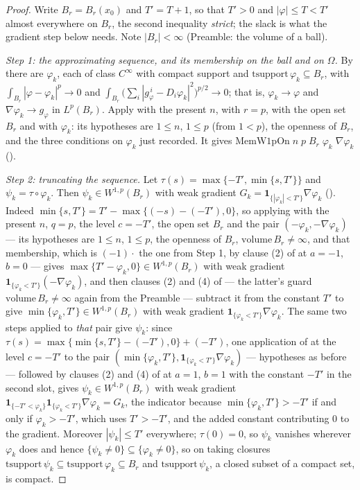 \begin{proof}
Write $B_r=B_r(x_0)$ and $T'=T+1$, so that $T'>0$ and $|\varphi|\le T<T'$
almost everywhere on $B_r$, the second inequality \emph{strict}; the slack is
what the gradient step below needs.  Note $|B_r|<\infty$ (Preamble: the volume
of a ball).

\emph{Step 1: the approximating sequence, and its membership on the ball and on
$\Omega$.}  By  there are $\varphi_k$, each of class
$C^\infty$ with compact support and $\mathrm{tsupport}\,\varphi_k\subseteq B_r$,
with $\int_{B_r}|\varphi-\varphi_k|^p\to0$ and
$\int_{B_r}\bigl(\sum_i|g_\varphi^{\,i}-D_i\varphi_k|^2\bigr)^{p/2}\to0$; that
is, $\varphi_k\to\varphi$ and $\nabla\varphi_k\to g_\varphi$ in $L^p(B_r)$.
Apply  with the present $n$, with $r=p$,
with the open set $B_r$ and with $\varphi_k$: its hypotheses are $1\le n$,
$1\le p$ (from $1<p$), the openness of $B_r$, and the three conditions on
$\varphi_k$ just recorded.  It gives
$\mathrm{MemW1pOn}\;n\;p\;B_r\;\varphi_k\;\nabla\varphi_k$
().

\emph{Step 2: truncating the sequence.}  Let
$\tau(s)=\max\{-T',\min\{s,T'\}\}$ and $\psi_k=\tau\circ\varphi_k$.  Then
$\psi_k\in W^{1,p}(B_r)$ with weak gradient
$G_k=\mathbf1_{\{|\varphi_k|<T'\}}\nabla\varphi_k$ ().
Indeed $\min\{s,T'\}=T'-\max\{(-s)-(-T'),0\}$, so applying
 with the present $n$, $q=p$, the level
$c=-T'$, the open set $B_r$ and the pair $(-\varphi_k,-\nabla\varphi_k)$ ---
its hypotheses are $1\le n$, $1\le p$, the openness of $B_r$,
$\mathrm{volume}\,B_r\ne\infty$, and that membership, which is $(-1)\cdot$ the
one from Step 1, by clause (2) of  at $a=-1$, $b=0$
--- gives $\max\{T'-\varphi_k,0\}\in W^{1,p}(B_r)$ with weak gradient
$\mathbf1_{\{\varphi_k<T'\}}(-\nabla\varphi_k)$, and then clauses (2) and (4) of
 --- the latter's guard
$\mathrm{volume}\,B_r\ne\infty$ again from the Preamble --- subtract it from the
constant $T'$ to give $\min\{\varphi_k,T'\}\in W^{1,p}(B_r)$ with weak gradient
$\mathbf1_{\{\varphi_k<T'\}}\nabla\varphi_k$.  The same two steps applied to
\emph{that} pair give $\psi_k$: since
$\tau(s)=\max\{\min\{s,T'\}-(-T'),0\}+(-T')$, one application of
 at the level $c=-T'$ to the pair
$(\min\{\varphi_k,T'\},\mathbf1_{\{\varphi_k<T'\}}\nabla\varphi_k)$ ---
hypotheses as before --- followed by clauses (2) and (4) of
 at $a=1$, $b=1$ with the constant $-T'$ in the
second slot, gives $\psi_k\in W^{1,p}(B_r)$ with weak gradient
$\mathbf1_{\{-T'<\varphi_k\}}\mathbf1_{\{\varphi_k<T'\}}\nabla\varphi_k=G_k$,
the indicator because $\min\{\varphi_k,T'\}>-T'$ if and only if
$\varphi_k>-T'$, which uses $T'>-T'$, and the added constant contributing $0$
to the gradient.  Moreover $|\psi_k|\le T'$ everywhere; $\tau(0)=0$, so
$\psi_k$ vanishes wherever $\varphi_k$ does and hence
$\{\psi_k\ne0\}\subseteq\{\varphi_k\ne0\}$, so on taking closures
$\mathrm{tsupport}\,\psi_k\subseteq\mathrm{tsupport}\,\varphi_k\subseteq B_r$
and $\mathrm{tsupport}\,\psi_k$, a closed subset of a compact set, is compact.


\end{proof}
